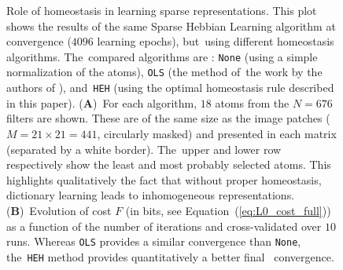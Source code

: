 \documentclass[vision,article,accept,oneauthor,pdftex]{Definitions/mdpi}
\begin{document}
\begin{figure}[H]
\caption{
{{Role} of homeostasis in learning sparse representations}.
This plot shows the results of the same Sparse Hebbian Learning algorithm at convergence ($4096$ learning epochs), but~using different homeostasis algorithms. The~compared algorithms are : \texttt{None} (using a simple normalization of the atoms), \texttt{OLS} (the method of~the work by the authors of \citep{Olshausen97}), and~\texttt{HEH} (using the optimal homeostasis rule described in this paper). {(\textbf{A})}~For each algorithm, $18$ atoms from the $N=676$ filters are shown. These are of the same size as the image patches ($M= 21 \times 21=441$, circularly masked) and presented in each matrix (separated by a white border). The~upper and lower row respectively show the least and most probably selected atoms. This highlights qualitatively the fact that without proper homeostasis, dictionary learning leads to inhomogeneous representations. {(\textbf{B})}~Evolution of cost $F$ (in bits, see Equation~(\ref{eq:L0_cost_full})) as a function of the number of iterations and cross-validated over $10$ runs. Whereas \texttt{OLS} provides a similar convergence than \texttt{None}, the~\texttt{HEH} method provides quantitatively a better final~ convergence. %
\label{fig:map}}%
\end{figure}%
\end{document}
